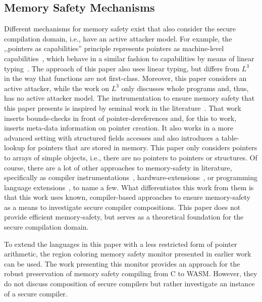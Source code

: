 \documentclass[utf8,acmsmall,review,screen,dvipsnames,anonymous]{acmart}
\begin{document}
\subsection{Memory Safety Mechanisms}\label{subsec:relw:msmechs}

Different mechanisms for memory safety exist that also consider the secure compilation domain, i.e., have an active attacker model.
For example, the ,,pointers as capabilities'' principle represents pointers as machine-level capabilities~\cite{korashy2021capableptrs}, which behave in a similar fashion to capabilities by means of linear typing~\cite{morrisett2005L3}.
The approach of this paper also uses linear typing, but differs from $L^{3}$~\cite{morrisett2005L3} in the way that functions are not first-class.
Moreover, this paper considers an active attacker, while the work on $L^{3}$ only discusses whole programs and, thus, has no active attacker model.
The instrumentation to ensure memory safety that this paper presents is inspired by seminal work in the literature~\cite{nagarakatte2009soft}.
That work inserts bounds-checks in front of pointer-dereferences and, for this to work, inserts meta-data information on pointer creation.
It also works in a more advanced setting with structured fields accesses and also introduces a table-lookup for pointers that are stored in memory.
This paper only considers pointers to arrays of simple objects, i.e., there are no pointers to pointers or structures.
Of course, there are a lot of other approaches to memory-safety in literature, specifically as compiler instrumentations~\cite{akritidis2009baggy,younan2010paricheck,jung2021pico,shankaranarayana2023tailcheck,dhumbumroong2020boundwarden,nam2019framer,zhou2023fatptrs}, hardware-extensions~\cite{kwon2013lowfat,saileshwar2022heapcheck,chen2023flexpointer,kim2023whistle}, or programming language extensions~\cite{elliott2018checkedc,li2022formalcheckedc,necula2005ccured,jim2002cyclone,elliott2015guilt,west2005cuckoo,weis2019fyr,benoit2019uniqueness}, to name a few.
What differentiates this work from them is that this work uses known, compiler-based approaches to ensure memory-safety as a means to investigate secure compiler compositions.
This paper does not provide efficient memory-safety, but serves as a theoretical foundation for the secure compilation domain.

To extend the languages in this paper with a less restricted form of pointer arithmetic, the region coloring memory safety monitor presented in earlier work~\cite{michael2023mswasm} can be used.
The work presenting this monitor provides an approach for the robust preservation of memory safety compiling from C to WASM.
However, they do not discuss composition of secure compilers but rather investigate an instance of a secure compiler.
\end{document}
